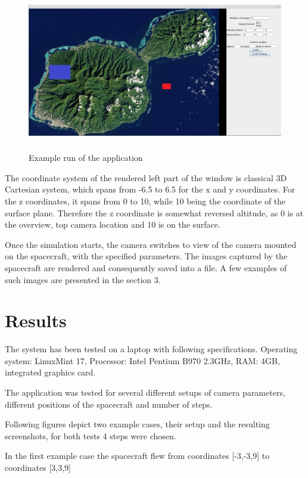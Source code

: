 \documentclass[english,12pt,a4paper,pdftex,elec,utf8]{aaltothesis}
\begin{document}
\begin{figure}[htb]
\centering \includegraphics[height=7cm]{GUIExample.png}
\caption{Example run of the application\label{GUIExample}}
\end{figure}

The coordinate system of the rendered left part of the window is classical 3D Cartesian system, which spans from -6.5 to 6.5 for the x and y coordinates. For the z coordinates, it spans from 0 to 10, while 10 being the coordinate of the surface plane. Therefore the z coordinate is somewhat reversed altitude, as 0 is at the overview, top camera location and 10 is on the surface.

Once the simulation starts, the camera switches to view of the camera mounted on the spacecraft, with the specified parameters. The images captured by the spacecraft are rendered and consequently saved into a file. A few examples of such images are presented in the section 3.

\clearpage

\section{Results}

The system has been tested on a laptop with following specifications. Operating system: LinuxMint 17, Processor: Intel Pentium B970 2.3GHz, RAM: 4GB, integrated graphics card.

The application was tested for several different setups of camera parameters, different positions of the spacecraft and number of steps. 

Following figures depict two example cases, their setup and the resulting screenshots, for both tests 4 steps were chosen.

In the first example case the spacecraft flew from coordinates [-3,-3,9] to coordinates [3,3,9]
\end{document}

